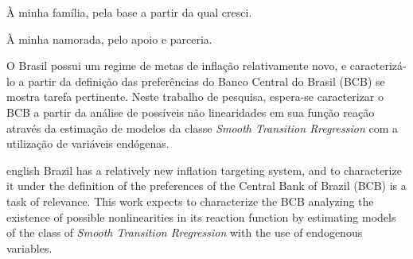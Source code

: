 \documentclass[
	article,			%
	11pt,				%
	oneside,			%
	a4paper,			%
	english,			%
	brazil,				%
	]{abntex2}
\begin{document}
\pagebreak
\begin{agradecimentos}
À minha família, pela base a partir da qual cresci. 

À minha namorada, pelo apoio e parceria.

\end{agradecimentos}


\pagebreak
\setlength{\absparsep}{18pt} %
\begin{resumo}
 O Brasil possui um regime de metas de inflação relativamente novo, e caracterizá-lo a partir da definição das preferências do Banco Central do Brasil (BCB) se mostra tarefa pertinente. Neste trabalho de pesquisa, espera-se caracterizar o BCB a partir da análise de possíveis não linearidades em sua função reação através da estimação de modelos da classe \textit{Smooth Transition Rregression} com a utilização de variáveis endógenas.

\end{resumo}

\pagebreak
\begin{resumo}[Abstract]
 \begin{otherlanguage*}{english}
   Brazil has a relatively new inflation targeting system, and to characterize it under the definition of the preferences of the Central Bank of Brazil (BCB) is a task of relevance. This work expects to characterize the BCB analyzing the existence of possible nonlinearities in its reaction function by estimating models of the class of \textit{Smooth Transition Rregression} with the use of endogenous variables.

   \vspace{\onelineskip}
 
   \noindent 
 \end{otherlanguage*}
\end{resumo}

\pagebreak
\begin{KeepFromToc}
  \tableofcontents
\end{KeepFromToc}
\pagebreak

\begin{KeepFromToc}
  \def\@tocrmarg{2.55em plus 3em}
	\listoftables
\end{KeepFromToc}
\pagebreak

\begin{KeepFromToc}
  \listoffigures
\end{KeepFromToc}
\pagebreak
\end{document}
